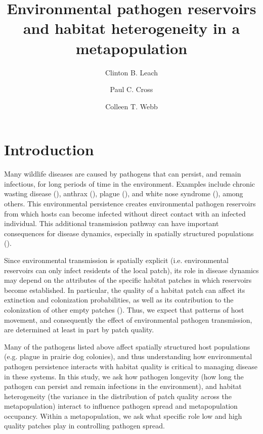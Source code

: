 \documentclass{svjour3}
\begin{document}
\title{Environmental pathogen reservoirs and habitat heterogeneity in a metapopulation}

\author{Clinton B. Leach \and Paul C. Cross \and Colleen T. Webb}




\maketitle

\section{Introduction}
\label{intro}

Many wildlife diseases are caused by pathogens that can persist, and remain infectious, for long periods of time in the environment.  Examples include chronic wasting disease (\cite{Miller2006}), anthrax (\cite{Dragon1995}), plague (\cite{Eisen2008}), and white nose syndrome (\cite{Lindner2011}), among others.  This environmental persistence creates environmental pathogen reservoirs from which hosts can become infected without direct contact with an infected individual.  This additional transmission pathway can have important consequences for disease dynamics, especially in spatially structured populations (\cite{Park2012}). 

Since environmental transmission is spatially explicit (i.e. environmental reservoirs can only infect residents of the local patch), its role in disease dynamics may depend on the attributes of the specific habitat patches in which reservoirs become established.  In particular, the quality of a habitat patch can affect its extinction and colonization probabilities, as well as its contribution to the colonization of other empty patches (\cite{Moilanen1998}).  Thus, we expect that patterns of host movement, and consequently the effect of environmental pathogen transmission, are determined at least in part by patch quality.  

Many of the pathogens listed above affect spatially structured host populations (e.g. plague in prairie dog colonies), and thus understanding how environmental pathogen persistence interacts with habitat quality is critical to managing disease in these systems.  In this study, we ask how pathogen longevity (how long the pathogen can persist and remain infections in the environment), and habitat heterogeneity (the variance in the distribution of patch quality across the metapopulation) interact to influence pathogen spread and metapopulation occupancy.  Within a metapopulation, we ask what specific role low and high quality patches play in controlling pathogen spread.  
\end{document}
